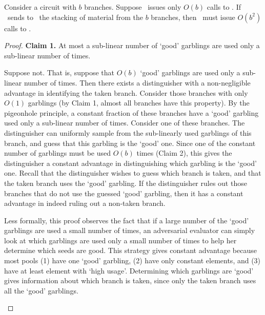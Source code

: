 \begin{theorem}
Consider a circuit with $b$ branches.  Suppose \Gen\ issues only
$O(b)$ calls to \Ev. If \Gen\ sends to \Eval\ the stacking of material from
the $b$ branches, then \Gen\ must issue $O(b^2)$  calls to \Gb.
\end{theorem}
\begin{proof}

\textbf{Claim 1.} At most a sub-linear number of
`good' garblings are used only a sub-linear number of times.
  \begin{subproof}
    Suppose not.
    That is, suppose that $O(b)$ `good' garblings are used only a
    sub-linear number of times.
    Then there exists a distinguisher with a non-negligible advantage
    in identifying the taken branch.
    Consider those branches with
    only $O(1)$ garblings (by Claim 1, almost all branches have this
    property). By the pigeonhole principle, a constant fraction of
    these branches have a `good' garbling used only a sub-linear
    number of times. Consider one of these branches. The distinguisher
    can uniformly sample from the sub-linearly used garblings of this
    branch, and guess that this garbling is the `good' one. Since one
    of the constant number of garblings must be used $O(b)$ times
    (Claim 2), this gives the distinguisher a constant advantage in
    distinguishing which garbling is the `good' one. Recall that the
    distinguisher wishes to guess which branch is taken, and that the
    taken branch uses the `good' garbling. If the distinguisher rules
    out those branches that do not use the guessed `good' garbling,
    then it has a constant advantage in indeed ruling out a non-taken
    branch.

    Less formally, this proof observes the fact that if a large number
    of the `good' garblings are used a small number of times, an
    adversarial evaluator can simply look at which garblings are used
    only a small number of times to help her determine which seeds are
    good.
    This strategy gives constant advantage because most pools (1) have
    one `good' garbling, (2) have only constant elements, and (3) have
    at least element with `high usage'.
    Determining which garblings are `good' gives information about which
    branch is taken, since only the taken branch uses all the `good'
    garblings.
  \end{subproof}
\end{proof}
